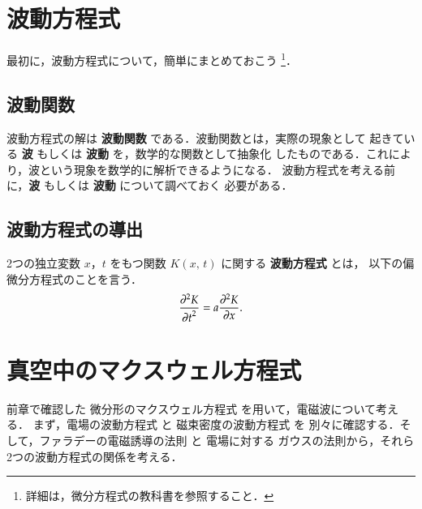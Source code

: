     \section{波動方程式}
        \begin{mycomment}
            最初に，波動方程式について，簡単にまとめておこう
            \footnote{
                詳細は，微分方程式の教科書を参照すること．
            }．
        \end{mycomment}

    \subsection{波動関数}
        波動方程式の解は \textbf{波動関数} である．波動関数とは，実際の現象として
        起きている \textbf{波} もしくは \textbf{波動} を，数学的な関数として抽象化
        したものである．これにより，波という現象を数学的に解析できるようになる．
        波動方程式を考える前に，\textbf{波} もしくは \textbf{波動} について調べておく
        必要がある．


    \subsection{波動方程式の導出}
        2つの独立変数 $x$，$t$ をもつ関数 $K(x,\,t)$ に関する \textbf{波動方程式} とは，
        以下の偏微分方程式のことを言う．
        \begin{align}
            \frac{{\partial}^{2} K}{{\partial t}^{2}}  = a \frac{{\partial}^{2}K}{{\partial x}}.
        \end{align}

    \section{真空中のマクスウェル方程式}
        \begin{mycomment}
        前章で確認した 微分形のマクスウェル方程式 を用いて，電磁波について考える．
        まず，電場の波動方程式 と 磁束密度の波動方程式 を
        別々に確認する．そして，ファラデーの電磁誘導の法則 と 電場に対する
        ガウスの法則から，それら2つの波動方程式の関係を考える．
        \end{mycomment}

